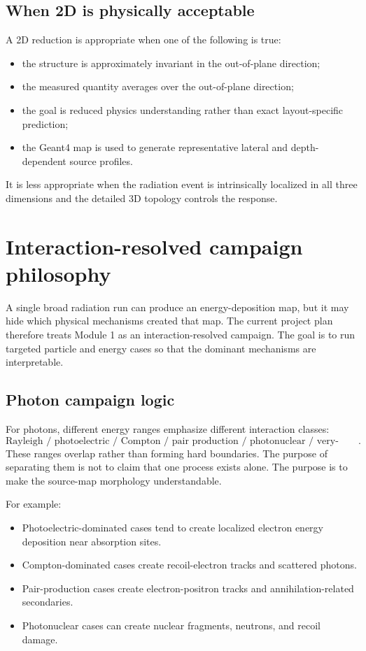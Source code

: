 \documentclass[11pt]{article}
\begin{document}
\subsection{When 2D is physically acceptable}

A 2D reduction is appropriate when one of the following is true:
\begin{itemize}
\item the structure is approximately invariant in the out-of-plane direction;
\item the measured quantity averages over the out-of-plane direction;
\item the goal is reduced physics understanding rather than exact layout-specific prediction;
\item the Geant4 map is used to generate representative lateral and depth-dependent source profiles.
\end{itemize}
It is less appropriate when the radiation event is intrinsically localized in all three dimensions and the detailed 3D topology controls the response.

\section{Interaction-resolved campaign philosophy}

A single broad radiation run can produce an energy-deposition map, but it may hide which physical mechanisms created that map. The current project plan therefore treats Module 1 as an interaction-resolved campaign. The goal is to run targeted particle and energy cases so that the dominant mechanisms are interpretable.

\subsection{Photon campaign logic}

For photons, different energy ranges emphasize different interaction classes:
\begin{equation}
\text{Rayleigh / photoelectric / Compton / pair production / photonuclear / very-high-energy reactions}.
\end{equation}
These ranges overlap rather than forming hard boundaries. The purpose of separating them is not to claim that one process exists alone. The purpose is to make the source-map morphology understandable.

For example:
\begin{itemize}
\item Photoelectric-dominated cases tend to create localized electron energy deposition near absorption sites.
\item Compton-dominated cases create recoil-electron tracks and scattered photons.
\item Pair-production cases create electron-positron tracks and annihilation-related secondaries.
\item Photonuclear cases can create nuclear fragments, neutrons, and recoil damage.
\end{itemize}
\end{document}
